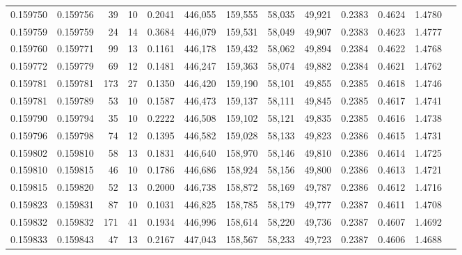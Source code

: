 \begin{tabular}{rrrrrrrrrrrrr}
0.159750 & 0.159756 &    39 &  10 &                                     0.2041 & 446,055 & 159,555 &  58,035 &  49,921 & 0.2383 & 0.4624 & 1.4780 \\
0.159759 & 0.159759 &    24 &  14 &                                     0.3684 & 446,079 & 159,531 &  58,049 &  49,907 & 0.2383 & 0.4623 & 1.4777 \\
0.159760 & 0.159771 &    99 &  13 &                                     0.1161 & 446,178 & 159,432 &  58,062 &  49,894 & 0.2384 & 0.4622 & 1.4768 \\
0.159772 & 0.159779 &    69 &  12 &                                     0.1481 & 446,247 & 159,363 &  58,074 &  49,882 & 0.2384 & 0.4621 & 1.4762 \\
0.159781 & 0.159781 &   173 &  27 &                                     0.1350 & 446,420 & 159,190 &  58,101 &  49,855 & 0.2385 & 0.4618 & 1.4746 \\
0.159781 & 0.159789 &    53 &  10 &                                     0.1587 & 446,473 & 159,137 &  58,111 &  49,845 & 0.2385 & 0.4617 & 1.4741 \\
0.159790 & 0.159794 &    35 &  10 &                                     0.2222 & 446,508 & 159,102 &  58,121 &  49,835 & 0.2385 & 0.4616 & 1.4738 \\
0.159796 & 0.159798 &    74 &  12 &                                     0.1395 & 446,582 & 159,028 &  58,133 &  49,823 & 0.2386 & 0.4615 & 1.4731 \\
0.159802 & 0.159810 &    58 &  13 &                                     0.1831 & 446,640 & 158,970 &  58,146 &  49,810 & 0.2386 & 0.4614 & 1.4725 \\
0.159810 & 0.159815 &    46 &  10 &                                     0.1786 & 446,686 & 158,924 &  58,156 &  49,800 & 0.2386 & 0.4613 & 1.4721 \\
0.159815 & 0.159820 &    52 &  13 &                                     0.2000 & 446,738 & 158,872 &  58,169 &  49,787 & 0.2386 & 0.4612 & 1.4716 \\
0.159823 & 0.159831 &    87 &  10 &                                     0.1031 & 446,825 & 158,785 &  58,179 &  49,777 & 0.2387 & 0.4611 & 1.4708 \\
0.159832 & 0.159832 &   171 &  41 &                                     0.1934 & 446,996 & 158,614 &  58,220 &  49,736 & 0.2387 & 0.4607 & 1.4692 \\
0.159833 & 0.159843 &    47 &  13 &                                     0.2167 & 447,043 & 158,567 &  58,233 &  49,723 & 0.2387 & 0.4606 & 1.4688 \\

\end{tabular}
